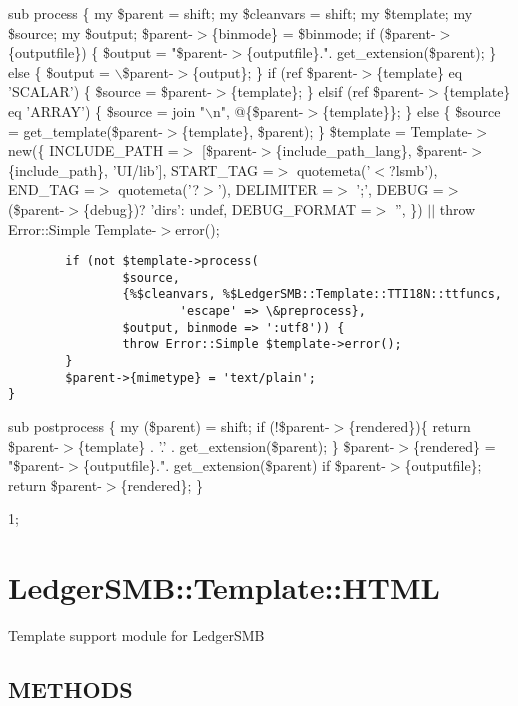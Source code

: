 \begin{description}
\begin{description}
\begin{description}
\begin{description}
\begin{description}
\begin{description}
\begin{description}
\begin{description}
\begin{description}
\begin{description}
sub process \{
	my \$parent = shift;
	my \$cleanvars = shift;
	my \$template;
	my \$source;
	my \$output;
        \$parent-$>$\{binmode\} = \$binmode;
	if (\$parent-$>$\{outputfile\}) \{
		\$output = "\$parent-$>$\{outputfile\}.". get\_extension(\$parent);
	\} else \{
		\$output = $\backslash$\$parent-$>$\{output\};
	\}
	if (ref \$parent-$>$\{template\} eq 'SCALAR') \{
		\$source = \$parent-$>$\{template\};
	\} elsif (ref \$parent-$>$\{template\} eq 'ARRAY') \{
		\$source = join "$\backslash$n", @\{\$parent-$>$\{template\}\};
	\} else \{
		\$source = get\_template(\$parent-$>$\{template\}, \$parent);
	\}
	\$template = Template-$>$new(\{
		INCLUDE\_PATH =$>$ [\$parent-$>$\{include\_path\_lang\}, \$parent-$>$\{include\_path\}, 'UI/lib'],
		START\_TAG =$>$ quotemeta('$<$?lsmb'),
		END\_TAG =$>$ quotemeta('?$>$'),
		DELIMITER =$>$ ';',
		DEBUG =$>$ (\$parent-$>$\{debug\})? 'dirs': undef,
		DEBUG\_FORMAT =$>$ '',
		\}) $|$$|$ throw Error::Simple Template-$>$error();

\begin{verbatim}
        if (not $template->process(
                $source, 
                {%$cleanvars, %$LedgerSMB::Template::TTI18N::ttfuncs,
                        'escape' => \&preprocess},
                $output, binmode => ':utf8')) {
                throw Error::Simple $template->error();
        }
        $parent->{mimetype} = 'text/plain';
}
\end{verbatim}


sub postprocess \{
    my (\$parent) = shift;
    if (!\$parent-$>$\{rendered\})\{
        return \$parent-$>$\{template\} . '.' . get\_extension(\$parent); 
    \}
    \$parent-$>$\{rendered\} = "\$parent-$>$\{outputfile\}.". get\_extension(\$parent) if \$parent-$>$\{outputfile\};
    return \$parent-$>$\{rendered\};
\}



1;

\section{LedgerSMB::Template::HTML\label{LedgerSMB::Template::HTML}}


Template support module for LedgerSMB

\subsection*{METHODS\label{LedgerSMB::Template::HTML_METHODS}}
\begin{description}


\end{description}
\end{description}
\end{description}
\end{description}
\end{description}
\end{description}
\end{description}
\end{description}
\end{description}
\end{description}
\end{description}
